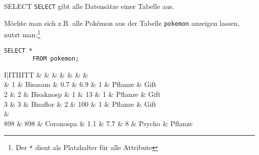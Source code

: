 \begin{sql}{SELECT}
    \texttt{SELECT} gibt alle Datensätze einer Tabelle aus.

    Möchte man sich z.B. alle Pokémon aus der Tabelle \texttt{pokemon} anzeigen lassen, nutzt man:\footnote{Der \texttt{*} dient als Platzhalter für alle Attribute}

    \begin{lstlisting}[language=mysql]
        SELECT *
        FROM pokemon;
    \end{lstlisting}

    \setcounter{rownum}{0}
    \begin{tabular}{I|ITIIITT}
                                   &     &  &  &  &  &  &  \\                          & 1                         & Bisasam                  & 0.7                         & 6.9                         & 1                              & Pflanze                        & Gift                             \\
        2                          & 2                         & Bisaknosp                & 1                           & 13                          & 1                              & Pflanze                        & Gift                             \\
        3                          & 3                         & Bisaflor                 & 2                           & 100                         & 1                              & Pflanze                        & Gift                             \\
         &                                                                                                                                                                                              \\
        898                        & 898                       & Coronospa                & 1.1                         & 7.7                         & 8                              & Psycho                         & Pflanze                          \\
    \end{tabular}
    \vspace{1em}


\end{sql}
